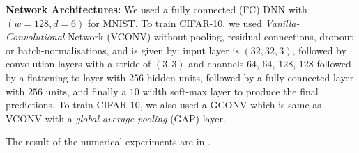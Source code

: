 \textbf{Network Architectures:} We used a fully connected (FC) DNN with $(w=128,d=6)$ for MNIST.%
To train CIFAR-10, we used \emph{Vanilla-Convolutional} Network (VCONV) without pooling, residual connections, dropout or batch-normalisations, and is given by: input layer is $(32, 32, 3)$, followed by convolution layers with a stride of $(3, 3)$ and channels $64$, $64$, $128$, $128$ followed by a flattening to layer with $256$ hidden units, followed by a fully connected layer with $256$ units, and finally a  $10$ width soft-max layer to produce the final predictions. To train CIFAR-10, we also used a GCONV which is same as VCONV with a \emph{global-average-pooling} (GAP) layer.

 
 
 The result of the numerical experiments are in . 
 \begin{table}[h]
\caption{Shows the training and generalisation performance of various NPFs.}
\label{tb:npfs}
\end{table}

